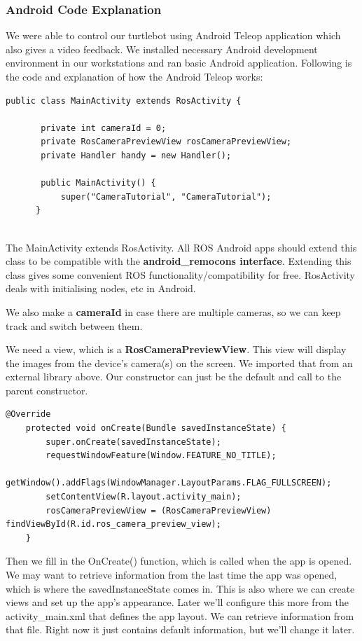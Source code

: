 \documentclass[10pt,a4paper]{article}
\begin{document}
\subsubsection{Android Code Explanation}
We were able to control our turtlebot using Android Teleop application which also gives a video feedback.
We installed necessary Android development environment in our workstations and ran basic Android application.
Following is the code and explanation of how the Android Teleop works:

\begin{lstlisting}[frame=single] 
public class MainActivity extends RosActivity {
    
       private int cameraId = 0;
       private RosCameraPreviewView rosCameraPreviewView;
       private Handler handy = new Handler();
    
       public MainActivity() {
           super("CameraTutorial", "CameraTutorial");
      }
   
\end{lstlisting}
   
The MainActivity extends RosActivity. All ROS Android apps should extend this class to be compatible with the \textbf{android\_remocons interface}. Extending this class gives some convenient ROS functionality/compatibility for free. RosActivity deals with initialising nodes, etc in Android.

We also make a \textbf{cameraId} in case there are multiple cameras, so we can keep track and switch between them. 

We need a view, which is a \textbf{RosCameraPreviewView}. This view will display the images from the device's camera(s) on the screen. We imported that from an external library above. Our constructor can just be the default and call to the parent constructor.

\begin{lstlisting}[frame=single] 
@Override
    protected void onCreate(Bundle savedInstanceState) {
        super.onCreate(savedInstanceState);
        requestWindowFeature(Window.FEATURE_NO_TITLE);
        getWindow().addFlags(WindowManager.LayoutParams.FLAG_FULLSCREEN);
        setContentView(R.layout.activity_main);
        rosCameraPreviewView = (RosCameraPreviewView) findViewById(R.id.ros_camera_preview_view);
    }
\end{lstlisting}

Then we fill in the OnCreate() function, which is called when the app is opened. We may want to retrieve information from the last time the app was opened, which is where the savedInstanceState comes in. This is also where we can create views and set up the app's appearance. Later we'll configure this more from the activity\_main.xml that defines the app layout. We can retrieve information from that file. Right now it just contains default information, but we'll change it later.
\end{document}
